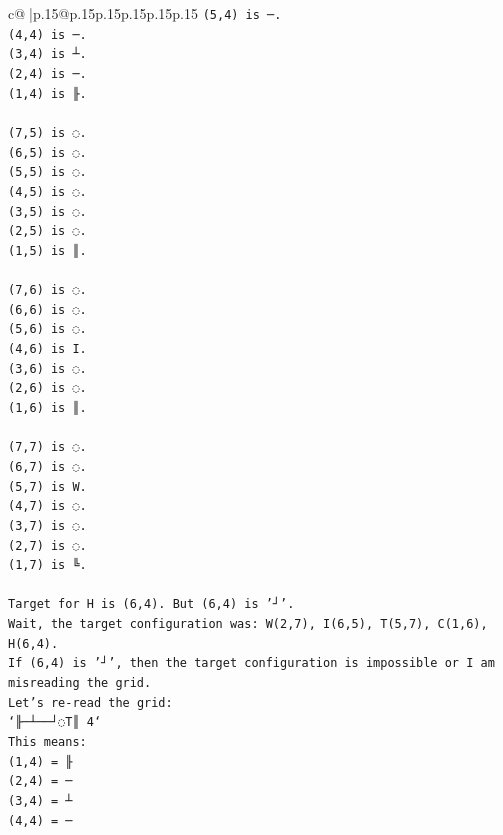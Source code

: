 \documentclass{article}
\begin{document}
{\begin{supertabular}{c@{$\;$}|p{.15\linewidth}@{}p{.15\linewidth}p{.15\linewidth}p{.15\linewidth}p{.15\linewidth}p{.15\linewidth}}
{{{\texttt{(5,4) is ─.} \\
\texttt{(4,4) is ─.} \\
\texttt{(3,4) is ┴.} \\
\texttt{(2,4) is ─.} \\
\texttt{(1,4) is ╟.} \\
\\ 
\texttt{(7,5) is ◌.} \\
\texttt{(6,5) is ◌.} \\
\texttt{(5,5) is ◌.} \\
\texttt{(4,5) is ◌.} \\
\texttt{(3,5) is ◌.} \\
\texttt{(2,5) is ◌.} \\
\texttt{(1,5) is ║.} \\
\\ 
\texttt{(7,6) is ◌.} \\
\texttt{(6,6) is ◌.} \\
\texttt{(5,6) is ◌.} \\
\texttt{(4,6) is I.} \\
\texttt{(3,6) is ◌.} \\
\texttt{(2,6) is ◌.} \\
\texttt{(1,6) is ║.} \\
\\ 
\texttt{(7,7) is ◌.} \\
\texttt{(6,7) is ◌.} \\
\texttt{(5,7) is W.} \\
\texttt{(4,7) is ◌.} \\
\texttt{(3,7) is ◌.} \\
\texttt{(2,7) is ◌.} \\
\texttt{(1,7) is ╚.} \\
\\ 
\texttt{Target for H is (6,4). But (6,4) is '┘'.} \\
\texttt{Wait, the target configuration was: W(2,7), I(6,5), T(5,7), C(1,6), H(6,4).} \\
\texttt{If (6,4) is '┘', then the target configuration is impossible or I am misreading the grid.} \\
\texttt{Let's re{-}read the grid:} \\
\texttt{`╟─┴──┘◌T║ 4`} \\
\texttt{This means:} \\
\texttt{(1,4) = ╟} \\
\texttt{(2,4) = ─} \\
\texttt{(3,4) = ┴} \\
\texttt{(4,4) = ─} \\
}}}
\end{supertabular}}
\end{document}
